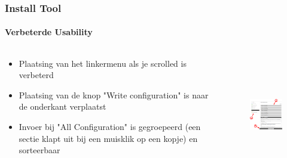 \begin{frame}[fragile]
	\frametitle{Install Tool}
	\framesubtitle{Verbeterde Usability}

	\begin{columns}[T]
		\begin{column}{.5\textwidth}

			\begin{itemize}
				\item Plaatsing van het linkermenu als je scrolled is verbeterd
				\item Plaatsing van de knop "Write configuration" is naar de onderkant verplaatst
				\item Invoer bij "All Configuration" is gegroepeerd (een sectie klapt uit bij een muisklik op een kopje) en sorteerbaar
			\end{itemize}

		\end{column}
		\begin{column}{.5\textwidth}

			\begin{figure}\vspace*{-0.4cm}
				\includegraphics[width=5cm,height=5cm]{Images/InstallTool/ImprovedUsability.png}
			\end{figure}

		\end{column}
	\end{columns}

\end{frame}


